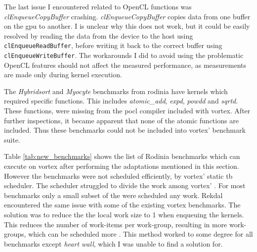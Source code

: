 The last issue I encountered related to OpenCL functions was \textit{clEnqueueCopyBuffer} crashing. \textit{clEnqueueCopyBuffer} copies data from one buffer on the \acrshort{gpu} to another. I is unclear why this does not work, but it could be easily resolved by reading the data from the device to the host using \texttt{clEnqueueReadBuffer}, before writing it back to the correct buffer using \texttt{clEnqueueWriteBuffer}. The workarounds I did to avoid using the problematic OpenCL features should not affect the measured performance, as measurements are made only during kernel execution.

The \textit{Hybridsort} and \textit{Myocyte} benchmarks from \Gls{rodinia} have kernels which required specific functions. This includes \textit{atomic\_add}, \textit{expd}, \textit{powdd} and \textit{sqrtd}. These functions, were missing from the \Gls{pocl} compiler included with \Gls{vortex}. After further inspections, it became apparent that none of the atomic functions are included. Thus these benchmarks could not be included into \Gls{vortex}' benchmark suite.

Table \ref{tab:new_benchmarks} shows the list of Rodinia benchmarks which can execute on \Gls{vortex} after performing the adaptations mentioned in this section. However the benchmarks were not scheduled efficiently, by \Gls{vortex}' static \acrshort{tb} scheduler. The scheduler struggled to divide the work among \Gls{vortex}' . For most benchmarks only a small subset of the  were scheduled any work. Rekdal \cite{Rekdal_Master} encountered the same issue with some of the existing \Gls{vortex} benchmarks. The solution was to reduce the the local work size to 1 when enqueuing the kernels. This reduces the number of work-items per work-group, resulting in more work-groups, which can be scheduled more . This method worked to some degree for all benchmarks except \textit{heart wall}, which I was unable to find a solution for.  

